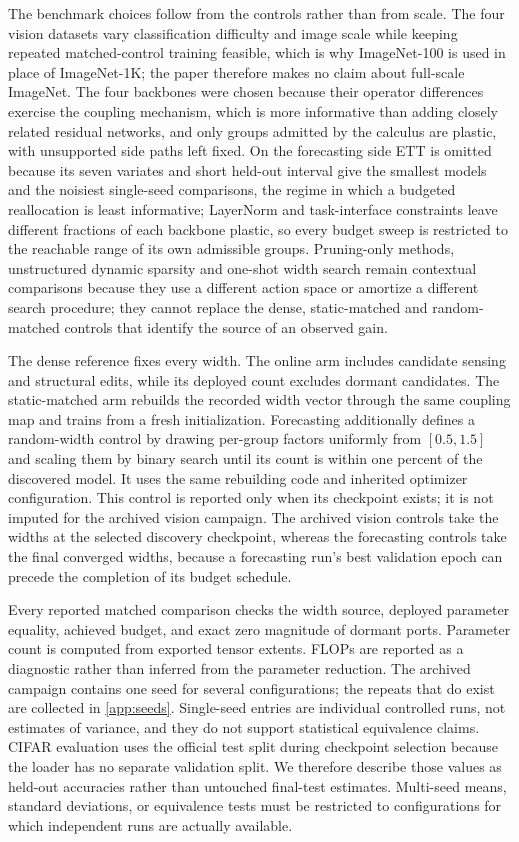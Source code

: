 \documentclass[10pt]{article}
\theoremstyle{paper}
\begin{document}
The benchmark choices follow from the controls rather than from scale. The four vision datasets vary classification difficulty and image scale while keeping repeated matched-control training feasible, which is why ImageNet-100 is used in place of ImageNet-1K; the paper therefore makes no claim about full-scale ImageNet. The four backbones were chosen because their operator differences exercise the coupling mechanism, which is more informative than adding closely related residual networks, and only groups admitted by the calculus are plastic, with unsupported side paths left fixed. On the forecasting side ETT is omitted because its seven variates and short held-out interval give the smallest models and the noisiest single-seed comparisons, the regime in which a budgeted reallocation is least informative; LayerNorm and task-interface constraints leave different fractions of each backbone plastic, so every budget sweep is restricted to the reachable range of its own admissible groups. Pruning-only methods, unstructured dynamic sparsity and one-shot width search \citep{han2015learning,evci2020rigging,8822c3c89a3f4ee0bf3b01a679aabd6b} remain contextual comparisons because they use a different action space or amortize a different search procedure; they cannot replace the dense, static-matched and random-matched controls that identify the source of an observed gain.

The dense reference fixes every width. The online arm includes candidate sensing and structural edits, while its deployed count excludes dormant candidates. The static-matched arm rebuilds the recorded width vector through the same coupling map and trains from a fresh initialization. Forecasting additionally defines a random-width control by drawing per-group factors uniformly from $[0.5,1.5]$ and scaling them by binary search until its count is within one percent of the discovered model. It uses the same rebuilding code and inherited optimizer configuration. This control is reported only when its checkpoint exists; it is not imputed for the archived vision campaign. The archived vision controls take the widths at the selected discovery checkpoint, whereas the forecasting controls take the final converged widths, because a forecasting run's best validation epoch can precede the completion of its budget schedule.

Every reported matched comparison checks the width source, deployed parameter equality, achieved budget, and exact zero magnitude of dormant ports. Parameter count is computed from exported tensor extents. FLOPs are reported as a diagnostic rather than inferred from the parameter reduction. The archived campaign contains one seed for several configurations; the repeats that do exist are collected in \cref{app:seeds}. Single-seed entries are individual controlled runs, not estimates of variance, and they do not support statistical equivalence claims. CIFAR evaluation uses the official test split during checkpoint selection because the loader has no separate validation split. We therefore describe those values as held-out accuracies rather than untouched final-test estimates. Multi-seed means, standard deviations, or equivalence tests must be restricted to configurations for which independent runs are actually available.
\end{document}
